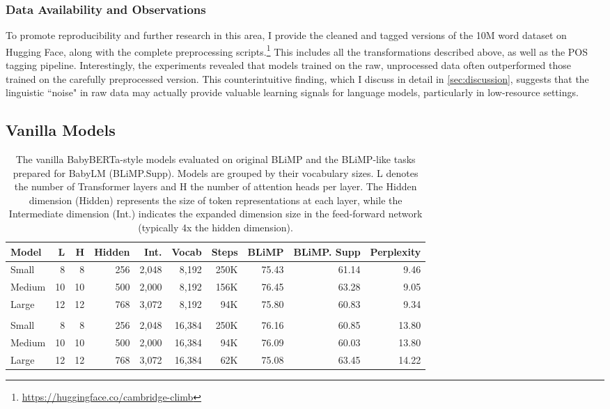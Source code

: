 \subsubsection{Data Availability and Observations}
To promote reproducibility and further research in this area, I provide the cleaned and tagged versions of the 10M word dataset on Hugging Face, along with the complete preprocessing scripts.\footnote{\url{https://huggingface.co/cambridge-climb}} This includes all the transformations described above, as well as the POS tagging pipeline. Interestingly, the experiments revealed that models trained on the raw, unprocessed data often outperformed those trained on the carefully preprocessed version. This counterintuitive finding, which I discuss in detail in \cref{sec:discussion}, suggests that the linguistic ``noise" in raw data may actually provide valuable learning signals for language models, particularly in low-resource settings.

\subsection{Vanilla Models}
\label{subsec:baseline}

\begin{table}
\centering
\small
\setlength{\tabcolsep}{4pt}  %
\begin{tabular}{l | rrrrr | rrrr}
\toprule
Model  & L & H & Hidden & Int. & Vocab & Steps & BLiMP & BLiMP. Supp & Perplexity \\
\midrule
Small  & 8 & 8 & 256 & 2,048   & 8,192   & 250K      & 75.43      & 61.14       & 9.46    \\
Medium & 10 & 10 & 500 & 2,000 & 8,192  & 156K      & 76.45      & 63.28        & 9.05  \\
Large  & 12 & 12 & 768 & 3,072 & 8,192   & 94K      & 75.80      & 60.83      & 9.34 \\[2mm]
\hline \\
Small  & 8 & 8 & 256 & 2,048   & 16,384  & 250K      & 76.16      & 60.85       & 13.80    \\
Medium & 10 & 10 & 500 & 2,000  & 16,384 & 94K      & 76.09      & 60.03        & 13.80     \\
Large  & 12 & 12 & 768 & 3,072 & 16,384  & 62K      & 75.08      & 63.45      & 14.22     \\
\bottomrule
\end{tabular}
\caption{\label{tbl:baseline-size-comparison} The vanilla BabyBERTa-style models evaluated on original BLiMP and the BLiMP-like tasks prepared for BabyLM (BLiMP.Supp). Models are grouped by their vocabulary sizes. L denotes the number of Transformer layers and H the number of attention heads per layer. The Hidden dimension (Hidden) represents the size of token representations at each layer, while the Intermediate dimension (Int.) indicates the expanded dimension size in the feed-forward network (typically 4x the hidden dimension).}
\end{table}

